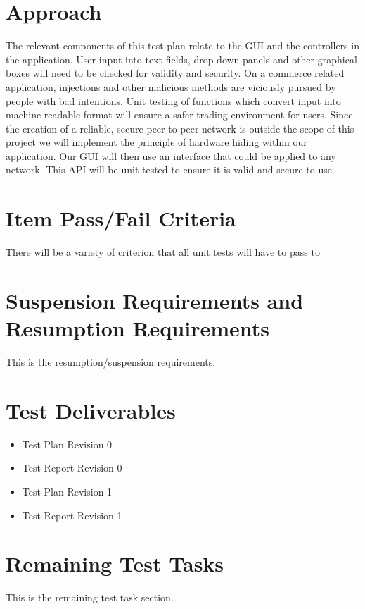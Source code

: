 \documentclass{article}
\begin{document}
\section*{Approach}
The relevant components of this test plan relate to the GUI and the controllers in the application. User input into text fields, drop down panels and other graphical boxes will need to be checked for validity and security. On a commerce related application, injections and other malicious methods are viciously pursued by people with bad intentions. Unit testing of functions which convert input into machine readable format will ensure a safer trading environment for users. Since the creation of a reliable, secure peer-to-peer network is outside the scope of this project we will implement the principle of hardware hiding within our application. Our GUI will then use an interface that could be applied to any network. This API will be unit tested to ensure it is valid and secure to use.

\section*{Item Pass/Fail Criteria}
There will be a variety of criterion that all unit tests will have to pass to

\section*{Suspension Requirements and Resumption Requirements}
This is the resumption/suspension requirements.

\section*{Test Deliverables}
\begin{itemize}
 \item
Test Plan Revision 0
 \item
Test Report Revision 0
 \item
Test Plan Revision 1
 \item
Test Report Revision 1
\end{itemize}

\section*{Remaining Test Tasks}
This is the remaining test task section.
\end{document}
